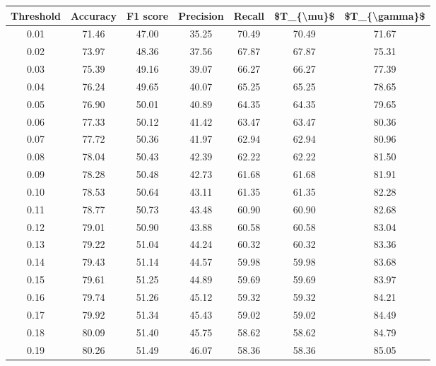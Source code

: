 \begin{tabular}{|c|c|c|c|c|c|c|}
\hline
 Threshold &  Accuracy &  F1 score &  Precision &  Recall &  \$T\_\{\textbackslash mu\}\$ &  \$T\_\{\textbackslash gamma\}\$ \\
\hline
      0.01 &     71.46 &     47.00 &      35.25 &   70.49 &      70.49 &         71.67 \\
      0.02 &     73.97 &     48.36 &      37.56 &   67.87 &      67.87 &         75.31 \\
      0.03 &     75.39 &     49.16 &      39.07 &   66.27 &      66.27 &         77.39 \\
      0.04 &     76.24 &     49.65 &      40.07 &   65.25 &      65.25 &         78.65 \\
      0.05 &     76.90 &     50.01 &      40.89 &   64.35 &      64.35 &         79.65 \\
      0.06 &     77.33 &     50.12 &      41.42 &   63.47 &      63.47 &         80.36 \\
      0.07 &     77.72 &     50.36 &      41.97 &   62.94 &      62.94 &         80.96 \\
      0.08 &     78.04 &     50.43 &      42.39 &   62.22 &      62.22 &         81.50 \\
      0.09 &     78.28 &     50.48 &      42.73 &   61.68 &      61.68 &         81.91 \\
      0.10 &     78.53 &     50.64 &      43.11 &   61.35 &      61.35 &         82.28 \\
      0.11 &     78.77 &     50.73 &      43.48 &   60.90 &      60.90 &         82.68 \\
      0.12 &     79.01 &     50.90 &      43.88 &   60.58 &      60.58 &         83.04 \\
      0.13 &     79.22 &     51.04 &      44.24 &   60.32 &      60.32 &         83.36 \\
      0.14 &     79.43 &     51.14 &      44.57 &   59.98 &      59.98 &         83.68 \\
      0.15 &     79.61 &     51.25 &      44.89 &   59.69 &      59.69 &         83.97 \\
      0.16 &     79.74 &     51.26 &      45.12 &   59.32 &      59.32 &         84.21 \\
      0.17 &     79.92 &     51.34 &      45.43 &   59.02 &      59.02 &         84.49 \\
      0.18 &     80.09 &     51.40 &      45.75 &   58.62 &      58.62 &         84.79 \\
      0.19 &     80.26 &     51.49 &      46.07 &   58.36 &      58.36 &         85.05 \\

\end{tabular}
